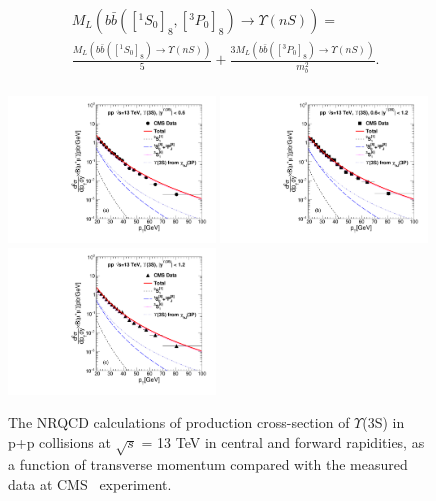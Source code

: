 \documentclass[review]{elsarticle}
\begin{document}
\begin{equation*}
  \begin{split}
    & M_L(b\bar{b}([^1S_0]_8,[^3P_0]_8)\rightarrow\Upsilon(nS)) = \\
    &\frac{M_L(b\bar{b}([^1S_0]_8)\rightarrow\Upsilon(nS))}{5} +\frac{3 M_L(b\bar{b}([^3P_0]_8)\rightarrow\Upsilon(nS))}{m_b^2}.\\
  \end{split}
\end{equation*}
\begin{figure}
  \centering
  \includegraphics[width=0.49\textwidth]{Figures/NRQCD_Beauty/Fig3a_Y3S_CMS_13TeV_Rap06.pdf}
  \includegraphics[width=0.49\textwidth]{Figures/NRQCD_Beauty/Fig3b_Y3S_CMS_13TeV_Rap0612.pdf}
  \includegraphics[width=0.49\textwidth]{Figures/NRQCD_Beauty/Fig3c_Y3S_CMS_13TeV_Rap12.pdf}
  \caption{\small{The NRQCD calculations of production cross-section of $\Upsilon$(3S) in p+p collisions at 
      $\sqrt{s}$ = 13 TeV in central and forward rapidities, as a function of transverse momentum compared with the measured data 
      at CMS~\cite{Sirunyan:2017qdw} experiment. }}
  \label{Fig:SigmaY3SCMS13TeV}
\end{figure}
\end{document}
